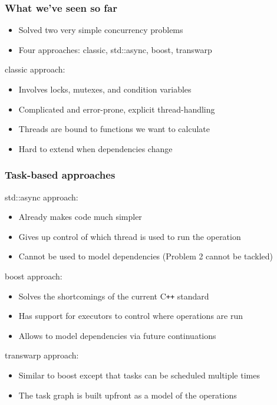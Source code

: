\documentclass[12pt,aspectratio=169]{beamer}
\begin{document}
\begin{frame}[fragile]
\frametitle{What we've seen so far}

\begin{itemize}
\item Solved two very simple concurrency problems
\item Four approaches: classic, std::async, boost, transwarp
\end{itemize}

\bigskip

classic approach:
\begin{itemize}
\item Involves locks, mutexes, and condition variables
\item Complicated and error-prone, explicit thread-handling
\item Threads are bound to functions we want to calculate
\item Hard to extend when dependencies change
\end{itemize}
\end{frame}

\begin{frame}[fragile]
\frametitle{Task-based approaches}

std::async approach:
\begin{itemize}
\item Already makes code much simpler
\item Gives up control of which thread is used to run the operation
\item Cannot be used to model dependencies (Problem 2 cannot be tackled)
\end{itemize}
\medskip

boost approach:
\begin{itemize}
\item Solves the shortcomings of the current C\texttt{++} standard
\item Has support for executors to control where operations are run
\item Allows to model dependencies via future continuations
\end{itemize}
\medskip

transwarp approach:
\begin{itemize}
\item Similar to boost except that tasks can be scheduled multiple times
\item The task graph is built upfront as a model of the operations
\end{itemize}
\end{frame}
\end{document}
